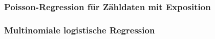 \documentclass[12pt,a4paper]{article}
\begin{document}
%

\subsubsection{Poisson-Regression für Zähldaten mit Exposition}

\subsubsection{Multinomiale logistische Regression}
\end{document}
